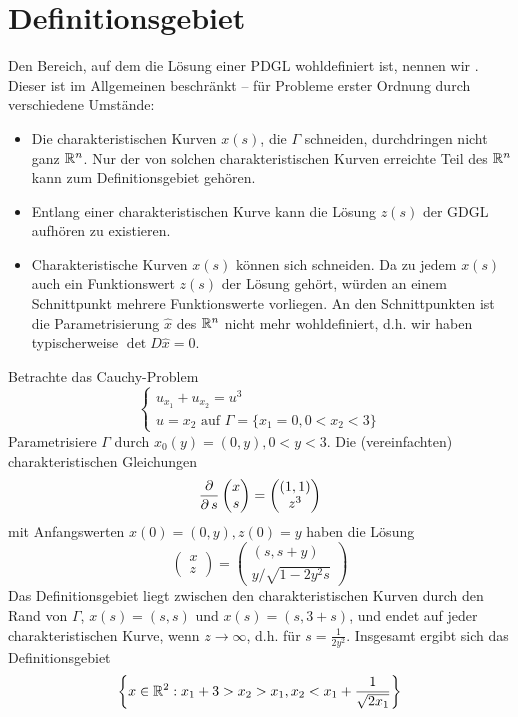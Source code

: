 \section{Definitionsgebiet}
\label{sec:para4}
Den Bereich, auf dem die Lösung einer PDGL wohldefiniert ist, nennen wir . Dieser ist im Allgemeinen beschränkt -- für Probleme erster Ordnung durch verschiedene Umstände:
	\begin{itemize}
		\item Die charakteristischen Kurven $x(s)$, die $\Gamma$ schneiden, durchdringen nicht ganz $\mathbb{R}^n$. Nur der von solchen charakteristischen Kurven erreichte Teil des $\mathbb{R}^n$ kann zum Definitionsgebiet gehören.
		\item Entlang einer charakteristischen Kurve kann die Lösung $z(s)$ der GDGL aufhören zu existieren.
		\item Charakteristische Kurven $x(s)$ können sich schneiden. Da zu jedem $x(s)$ auch ein Funktionswert $z(s)$ der Lösung gehört,	würden an einem Schnittpunkt mehrere Funktionswerte vorliegen. An den Schnittpunkten ist die Parametrisierung $\widehat{x}$ des $\mathbb{R}^n$ nicht mehr wohldefiniert, d.h. wir haben typischerweise $\det D\widehat{x} = 0$.
	\end{itemize}

\begin{bsp} \label{bsp_11}
	Betrachte das Cauchy-Problem \marginnote{[11]}
	\[ \begin{cases}
		u_{x_1} + u_{x_2} = u^3 \\
		u = x_2	\text{ auf } \Gamma = \{x_1 = 0, 0 < x_2 < 3\}
		\end{cases} \]
	Parametrisiere $\Gamma$ durch $x_0(y) = (0,y), 0 < y < 3$. Die (vereinfachten) charakteristischen Gleichungen
	\[ \frac{\operatorname{\partial}}{\operatorname{\partial} s} \begin{pmatrix} x \\ s \end{pmatrix} = \begin{pmatrix} (1,1) \\ z^3 \end{pmatrix} \]
	mit Anfangswerten $x(0) = (0,y), z(0) = y$ haben die Lösung
	\[ \begin{pmatrix} x \\ z \end{pmatrix} = \begin{pmatrix} (s,s+y) \\ y/\sqrt{1-2y^2s} \end{pmatrix} \]
	Das Definitionsgebiet liegt zwischen den charakteristischen Kurven durch den Rand von $\Gamma$, $x(s) = (s,s)$ und $x(s) = (s,3+s)$, und endet auf jeder charakteristischen Kurve, wenn $z \rightarrow \infty$, d.h. für $s = \frac{1}{2y^2}$. Insgesamt ergibt sich das Definitionsgebiet
	\[ \left\{ x \in \mathbb{R}^2 : x_1 + 3 > x_2 > x_1, x_2 < x_1 + \frac{1}{\sqrt{2x_1}} \right\} \]
\end{bsp}

